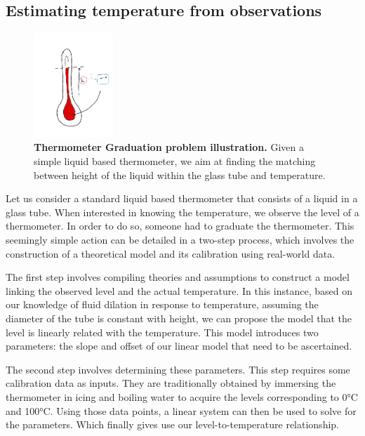 \begin{bibunit}
\subsection*{Estimating temperature from observations}
\begin{figure}[h]
    \centering
        \includegraphics[clip, width=3cm]{Introduction/pics/therm_pb.png}
    \caption{\textbf{Thermometer Graduation problem illustration.} Given a simple liquid based thermometer, we aim at finding the matching between height of the liquid within the glass tube and temperature.}
    \label{fig:therm_calib}
\end{figure}

Let us consider a standard liquid based thermometer that consists of a liquid in a glass tube.
When interested in knowing the temperature, we observe the level of a thermometer.
In order to do so, someone had to graduate the thermometer. 
This seemingly simple action can be detailed in a two-step process, which involves the construction of a theoretical model and its calibration using real-world data.

The first step involves compiling theories and assumptions to construct a model linking the observed level and the actual temperature.
In this instance, based on our knowledge of fluid dilation in response to temperature, assuming the diameter of the tube is constant with height, we can propose the model that the level is linearly related with the temperature.
This model introduces two parameters: the slope and offset of our linear model that need to be ascertained.

The second step involves determining these parameters. This step requires some calibration data as inputs. They are traditionally obtained by immersing the thermometer in icing and boiling water to acquire the levels corresponding to 0°C and 100°C.
  Using those data points, a linear system can then be used to solve for the parameters. Which finally gives use our level-to-temperature relationship.



\end{bibunit}
